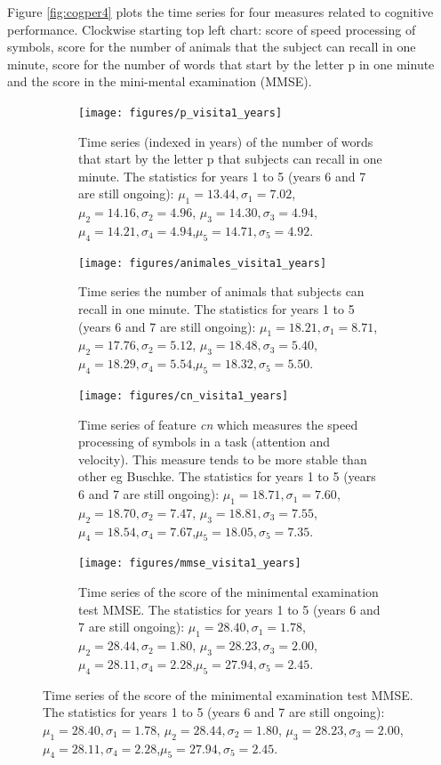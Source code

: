 \documentclass[11pt]{article}
\theoremstyle{definition}
\theoremstyle{remark}
\begin{document}
Figure \ref{fig:cogper4} plots the time series for four measures related to cognitive performance. Clockwise starting top left chart: score of speed processing of symbols, score for the number of animals that the subject can recall in one minute, score for the number of words that start by the letter p in one minute and the score in the mini-mental examination (MMSE).

\begin{figure}[H]
    \centering
    \begin{subfigure}[t]{0.45\textwidth}
        \centering
        \texttt{[image: figures/p\_visita1\_years]}
        \caption{Time series (indexed in years) of the  number of words that start by the letter p that subjects can recall in one minute. The statistics for years 1 to 5 (years 6 and 7 are still ongoing): $\mu_{1}=13.44, \sigma_{1}=7.02$, $\mu_{2}=14.16, \sigma_{2}=4.96$, $\mu_{3}=14.30, \sigma_{3}=4.94$, $\mu_{4}=14.21, \sigma_{4}=4.94$,$\mu_{5}=14.71,\sigma_{5}=4.92$.}
    \end{subfigure}
    \hfill
    \begin{subfigure}[t]{0.45\textwidth}
        \centering
        \texttt{[image: figures/animales\_visita1\_years]}
        \caption{Time series the  number of animals that subjects can recall in one minute. The statistics for years 1 to 5 (years 6 and 7 are still ongoing): $\mu_{1}=18.21, \sigma_{1}=8.71$, $\mu_{2}=17.76, \sigma_{2}=5.12$, $\mu_{3}=18.48, \sigma_{3}=5.40$, $\mu_{4}=18.29, \sigma_{4}=5.54$,$\mu_{5}=18.32,\sigma_{5}=5.50$.}
    \end{subfigure}%
    
     \begin{subfigure}[t]{0.45\textwidth}
        \centering
        \texttt{[image: figures/cn\_visita1\_years]}
        \caption{Time series of feature \emph{cn} which measures the speed processing of symbols in a task (attention and velocity). This measure tends to be more stable than other eg Buschke. The statistics for years 1 to 5 (years 6 and 7 are still ongoing): $\mu_{1}=18.71, \sigma_{1}=7.60$, $\mu_{2}=18.70, \sigma_{2}=7.47$, $\mu_{3}=18.81, \sigma_{3}=7.55$, $\mu_{4}=18.54, \sigma_{4}=7.67$,$\mu_{5}=18.05,\sigma_{5}=7.35$.}
    \end{subfigure}
    \hfill
    \begin{subfigure}[t]{0.45\textwidth}
        \centering
        \texttt{[image: figures/mmse\_visita1\_years]}
        \caption{Time series of the score of the minimental examination test MMSE. The statistics for years 1 to 5 (years 6 and 7 are still ongoing): $\mu_{1}=28.40, \sigma_{1}=1.78$, $\mu_{2}=28.44, \sigma_{2}=1.80$, $\mu_{3}=28.23, \sigma_{3}=2.00$, $\mu_{4}=28.11, \sigma_{4}=2.28$,$\mu_{5}=27.94,\sigma_{5}=2.45$.}
    \end{subfigure}%
   

\end{figure}
\end{document}
